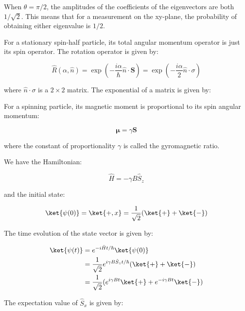 \documentclass[12pt]{article}
\begin{document}
When $\theta = \pi/2$, the amplitudes of the coefficients of the eigenvectors are both $1/\sqrt{2}$. This means that for a measurement on the xy-plane, the probability of obtaining either eigenvalue is $1/2$.


For a stationary spin-half particle, its total angular momentum operator is just its spin operator. The rotation operator is given by:

\begin{equation}
    \hat{R}(\alpha, \hat{n}) = \exp \left( -\frac{i\alpha}{\hbar} \hat{n} \cdot \mathbf{S} \right) = \exp \left( -\frac{i\alpha}{2} \hat{n} \cdot \sigma \right)
\end{equation}

where $\hat{n} \cdot \sigma$ is a $2 \times 2$ matrix. The exponential of a matrix is given by:


For a spinning particle, its magnetic moment is proportional to its spin angular momentum:

\begin{equation}
    \mathbf{\mu} = \gamma \mathbf{S}
\end{equation}

where the constant of proportionality $\gamma$ is called the gyromagnetic ratio.

We have the Hamiltonian:

\begin{equation}
    \hat{H} = -\gamma B \hat{S}_{z}
\end{equation}

and the initial state:

\begin{equation}
    \ket{\psi(0)} = \ket{+, x} = \frac{1}{\sqrt{2}} (\ket{+} + \ket{-})
\end{equation}

The time evolution of the state vector is given by:

\begin{equation}
\begin{split}
    \ket{\psi(t)} &= e^{-i\hat{H}t/\hbar} \ket{\psi(0)} \\
    &= \frac{1}{\sqrt{2}} e^{i\gamma B \hat{S}_{z} t/\hbar} (\ket{+} + \ket{-}) \\
    &= \frac{1}{\sqrt{2}} (e^{i\gamma B t} \ket{+} + e^{-i\gamma B t} \ket{-})
\end{split}
\end{equation}

The expectation value of $\hat{S}_{x}$ is given by:
\end{document}
